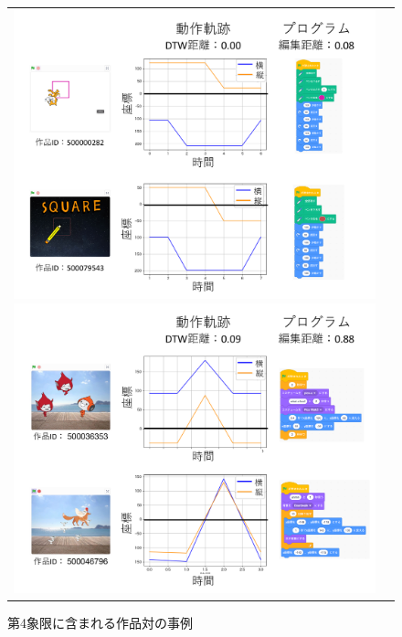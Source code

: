\documentclass[T,J]{fose} %
\begin{document}
\begin{figure}[t]
    \begin{tabular}{cc}

  \begin{minipage}[b]{0.45\linewidth}
    \centering
	\includegraphics[keepaspectratio, scale=0.14]{Okamoto_fig/quadrant-3.pdf}
	\caption{第3象限に含まれる作品対の事例}
	\label{fig:distance-boxplot3}
  \end{minipage}
  \begin{minipage}[b]{0.45\linewidth}
    \centering
	\includegraphics[keepaspectratio, scale=0.14]{Okamoto_fig/quadrant-4.pdf}
	\caption{第4象限に含まれる作品対の事例}
	\label{fig:distance-boxplot4}
  \end{minipage}
    \end{tabular}
\end{figure}
\end{document}
